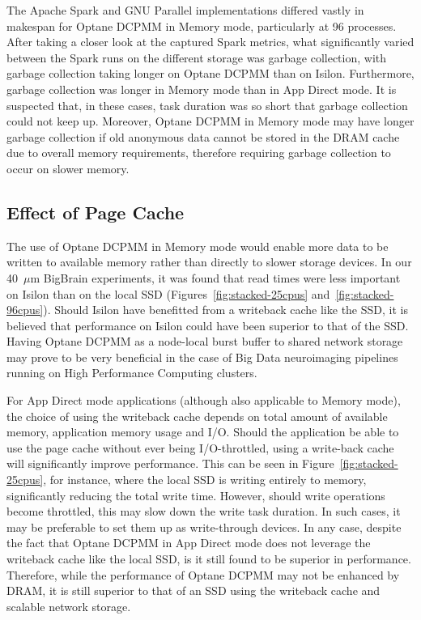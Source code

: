 \documentclass[conference]{IEEEtran}
\newcommand{\bigbrain}{BigBrain\xspace}
\begin{document}
The Apache Spark and GNU Parallel implementations differed vastly in makespan 
for Optane DCPMM in Memory mode, particularly at 96 processes. After taking a closer look at
the captured Spark metrics, what significantly varied between the Spark runs on
the different storage was garbage collection, with garbage collection taking longer on Optane DCPMM 
than on Isilon. Furthermore, garbage collection was longer in Memory mode than in
App Direct mode. It is suspected that, in these cases, task duration was so short
that garbage collection could not keep up. Moreover, Optane DCPMM in Memory mode may have longer
garbage collection if old anonymous data cannot be stored in the DRAM cache due to overall memory 
requirements, therefore requiring garbage collection to occur on slower memory.

\subsection{Effect of Page Cache}

The use of Optane DCPMM in Memory mode would enable more data to be written to available memory
rather than directly to slower storage devices. In our 40~$\mu$m \bigbrain experiments, it was found
that read times were less important on Isilon than on the local SSD (Figures~\ref{fig:stacked-25cpus}
and~\ref{fig:stacked-96cpus}). Should Isilon have benefitted from a 
writeback cache like the SSD, it is believed that performance on Isilon could have been superior 
to that of the SSD. Having Optane DCPMM as a node-local burst buffer to shared network storage 
may prove to be very beneficial in the case of Big Data neuroimaging pipelines running on
High Performance Computing clusters.

For App Direct mode applications (although also applicable to Memory mode), the 
choice of using the writeback cache depends on total amount of available memory, application
memory usage and I/O. Should the application be able to use the page cache without ever being
I/O-throttled, using a write-back cache will significantly improve performance. This can 
be seen in Figure~\ref{fig:stacked-25cpus}, for instance, where the local SSD is writing
entirely to memory, significantly reducing the total write time. However, should write operations
become throttled, this may slow down the write task duration. In such cases,
it may be preferable to set them up as write-through devices. In any case,
 despite the fact that Optane DCPMM in App Direct mode does
not leverage the writeback cache like the local SSD, is it still found to be superior in performance.
Therefore, while the performance of Optane DCPMM may not be enhanced by DRAM, it is still superior to that of
an SSD using the writeback cache and scalable network storage.
\end{document}
